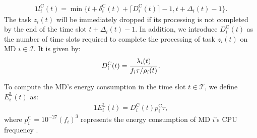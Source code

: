 \documentclass[12pt,draftclsnofoot,onecolumn]{IEEEtran}
\begin{document}
\begin{alignat}{1}
	l_i^{\text{C}}(t) = \min \Big\{t + \delta_i^{\text{C}}(t) + \lceil D_i^{\text{C}}(t) \rceil - 1, t + \Delta_i(t) - 1\Big\}.
	\label{6}  
\end{alignat}
The task $z_i(t)$ will be immediately dropped if its processing is not completed by the end of the time slot $t + \Delta_i(t) - 1$. In addition, we introduce $D_i^{\text{C}}(t)$ as the number of time slots required to complete the processing of task $z_i(t)$ on MD $i \in \mathcal{I}$. It is given by:
\begin{alignat}{1}
	D_i^{\text{C}}(t) = { \lambda_i(t)  \over  f_i  \tau /  \rho_i(t)}.
	\label{7}  
\end{alignat}



To compute the MD's energy consumption in the time slot $t \in \mathcal{T}$, we define $E_i^{\text{L}}(t)$ as:
\begin{alignat}{1}
	E_i^{\text{L}}(t) =  D_i^{\text{C}}(t) p_i^{\text{C}}  \tau, %
	\label{8}  
\end{alignat}
where $p_i^{\text{C}} = 10^{-27}(f_i)^3$ represents the energy consumption of MD $i$'s CPU frequency \cite{mao2016dynamic}.
\end{document}
